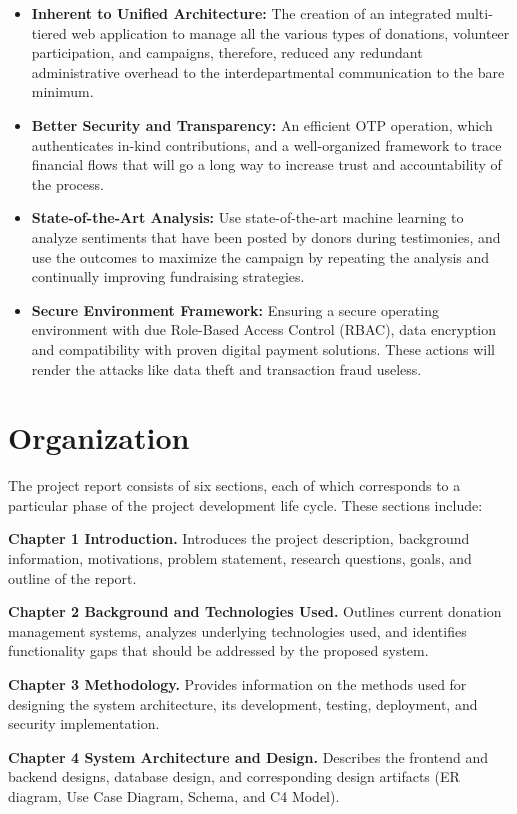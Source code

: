 \documentclass{thesis-library}
\begin{document}
\begin{itemize}
    \item \textbf{Inherent to Unified Architecture:} The creation of an integrated multi-tiered web application to manage all the various types of donations, volunteer participation, and campaigns, therefore, reduced any redundant administrative overhead to the interdepartmental communication to the bare minimum.
    \item \textbf{Better Security and Transparency:} An efficient OTP operation, which authenticates in-kind contributions, and a well-organized framework to trace financial flows that will go a long way to increase trust and accountability of the process.  
    \item \textbf{State-of-the-Art Analysis:} Use state-of-the-art machine learning to analyze sentiments that have been posted by donors during testimonies, and use the outcomes to maximize the campaign by repeating the analysis and continually improving fundraising strategies.
    \item \textbf{Secure Environment Framework:} Ensuring a secure operating environment with due Role-Based Access Control (RBAC), data encryption and compatibility with proven digital payment solutions. These actions will render the attacks like data theft and transaction fraud useless.
\end{itemize}

\newpage
\section{Organization}

The project report consists of six sections, each of which corresponds to a particular phase of the project development life cycle. These sections include:

\textbf{Chapter 1 Introduction.} Introduces the project description, background information, motivations, problem statement, research questions, goals, and outline of the report.

\textbf{Chapter 2 Background and Technologies Used.} Outlines current donation management systems, analyzes underlying technologies used, and identifies functionality gaps that should be addressed by the proposed system.

\textbf{Chapter 3 Methodology.} Provides information on the methods used for designing the system architecture, its development, testing, deployment, and security implementation.

\textbf{Chapter 4 System Architecture and Design.} Describes the frontend and backend designs, database design, and corresponding design artifacts (ER diagram, Use Case Diagram, Schema, and C4 Model).
\end{document}
